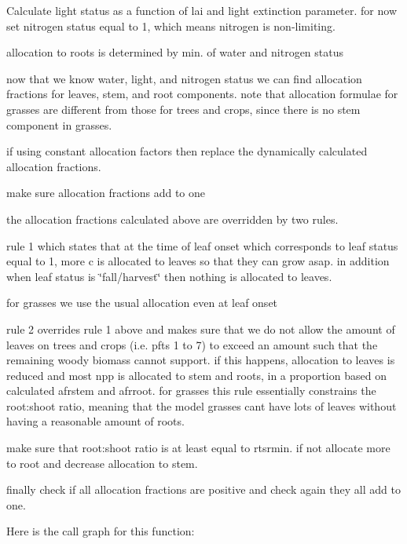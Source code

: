 Calculate light status as a function of lai and light extinction parameter. for now set nitrogen status equal to 1, which means nitrogen is non-\/limiting.

allocation to roots is determined by min. of water and nitrogen status

now that we know water, light, and nitrogen status we can find allocation fractions for leaves, stem, and root components. note that allocation formulae for grasses are different from those for trees and crops, since there is no stem component in grasses.

if using constant allocation factors then replace the dynamically calculated allocation fractions.

make sure allocation fractions add to one

the allocation fractions calculated above are overridden by two rules.

rule 1 which states that at the time of leaf onset which corresponds to leaf status equal to 1, more c is allocated to leaves so that they can grow asap. in addition when leaf status is \char`\"{}fall/harvest\char`\"{} then nothing is allocated to leaves.

for grasses we use the usual allocation even at leaf onset

rule 2 overrides rule 1 above and makes sure that we do not allow the amount of leaves on trees and crops (i.\+e. pfts 1 to 7) to exceed an amount such that the remaining woody biomass cannot support. if this happens, allocation to leaves is reduced and most npp is allocated to stem and roots, in a proportion based on calculated afrstem and afrroot. for grasses this rule essentially constrains the root\+:shoot ratio, meaning that the model grasses can\textquotesingle{}t have lots of leaves without having a reasonable amount of roots.

make sure that root\+:shoot ratio is at least equal to rtsrmin. if not allocate more to root and decrease allocation to stem.

finally check if all allocation fractions are positive and check again they all add to one.

Here is the call graph for this function\+:
